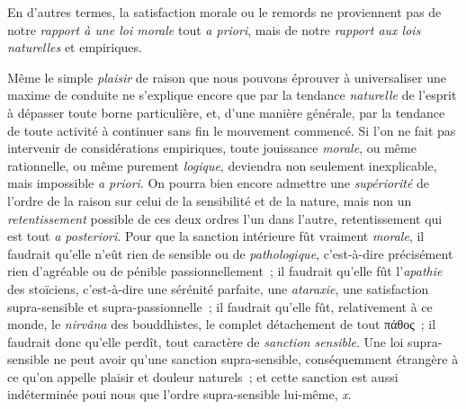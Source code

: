 \documentclass[french,twoside]{book} %
\begin{document}
En d’autres termes, la satisfaction morale ou le remords ne proviennent pas de notre \emph{rapport à une loi morale} tout \emph{a priori}, mais de notre \emph{rapport aux lois naturelles} et empiriques.\par
Même le simple \emph{plaisir} de raison que nous pouvons éprouver à universaliser une maxime de conduite ne s’explique encore que par la tendance \emph{naturelle} de l’esprit à dépasser toute borne particulière, et, d’une manière générale, par la tendance de toute activité à continuer sans fin le mouvement commencé. Si l’on ne fait pas intervenir de considérations empiriques, toute jouissance \emph{morale}, ou même rationnelle, ou même purement \emph{logique}, deviendra non seulement inexplicable, mais impossible \emph{a priori}. On pourra bien encore admettre une \emph{supériorité} de l’ordre de la raison sur celui de la sensibilité et de la nature, mais non un \emph{retentissement} possible de ces deux ordres l’un dans l’autre, retentissement qui est tout \emph{a posteriori}. Pour que la sanction intérieure fût vraiment \emph{morale}, il faudrait qu’elle n’eût rien de sensible ou de \emph{pathologique}, c’est-à-dire précisément rien d’agréable ou de pénible passionnellement ; il faudrait qu’elle fût l’\emph{apathie} des stoïciens, c’est-à-dire une sérénité parfaite, une \emph{ataraxie}, une satisfaction supra-sensible et supra-passionnelle ; il faudrait qu’elle fût, relativement à ce monde, le \emph{nirvâna} des bouddhistes, le complet détachement de tout πάθος ; il faudrait donc qu’elle perdît, tout caractère de \emph{sanction sensible}. Une loi supra-sensible ne peut avoir qu’une sanction supra-sensible, conséquemment étrangère à ce qu’on appelle plaisir et douleur naturels ; et cette sanction est aussi indéterminée poui nous que l’ordre supra-sensible lui-même, \emph{x}.\par
\end{document}
